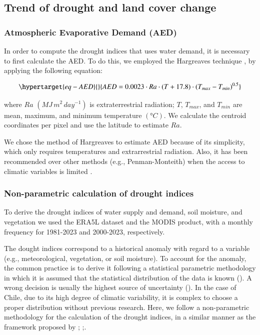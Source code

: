 \documentclass[
  authoryear,
  preprint,
  3p,
  onecolumn]{elsarticle}
\begin{document}
\hypertarget{trend-of-drought-and-land-cover-change}{%
\subsection{Trend of drought and land cover
change}\label{trend-of-drought-and-land-cover-change}}

\hypertarget{atmospheric-evaporative-demand-aed}{%
\subsubsection{Atmospheric Evaporative Demand
(AED)}\label{atmospheric-evaporative-demand-aed}}

In order to compute the drought indices that uses water demand, it is
necessary to first calculate the AED. To do this, we employed the
Hargreaves technique \citep{Hargreaves1994, Hargreaves1985}, by applying
the following equation:

\begin{equation}\protect\hypertarget{eq-AED}{}{AED = 0.0023\cdot Ra\cdot (T+17.8)\cdot (T_{max}-T_{min})^{0.5}}\label{eq-AED}\end{equation}

where \(Ra\) \((MJ\,m^2\, day^{-1})\) is extraterrestrial radiation;
\(T\), \(T_{max}\), and \(T_{min}\) are mean, maximum, and minimum
temperature \((°C)\). We calculate the centroid coordinates per pixel
and use the latitude to estimate \(Ra\).

We chose the method of Hargreaves to estimate AED because of its
simplicity, which only requires temperatures and extrarrestrial
radiation. Also, it has been recommended over other methods (e.g.,
Penman-Monteith) when the access to climatic variables is limited
\citep{Vicente-Serrano2014}.

\hypertarget{non-parametric-calculation-of-drought-indices}{%
\subsubsection{Non-parametric calculation of drought
indices}\label{non-parametric-calculation-of-drought-indices}}

To derive the drought indices of water supply and demand, soil moisture,
and vegetation we used the ERA5L dataset and the MODIS product, with a
monthly frequency for 1981-2023 and 2000-2023, respectively.

The dought indices correspond to a historical anomaly with regard to a
variable (e.g., meteorological, vegetation, or soil moisture). To
account for the anomaly, the common practice is to derive it following a
statistical parametric methodology in which it is assumed that the
statistical distribution of the data is known (\citet{Heim2002}). A
wrong decision is usually the highest source of uncertainty
(\citet{Laimighofer2022}). In the case of Chile, due to its high degree
of climatic variability, it is complex to choose a proper distribution
without previous research. Here, we follow a non-parametric methodology
for the calculation of the drought indices, in a similar manner as the
framework proposed by \citet{Farahmand2015};
\citet{Hobbins2016};\citet{McEvoy2016}.
\end{document}
